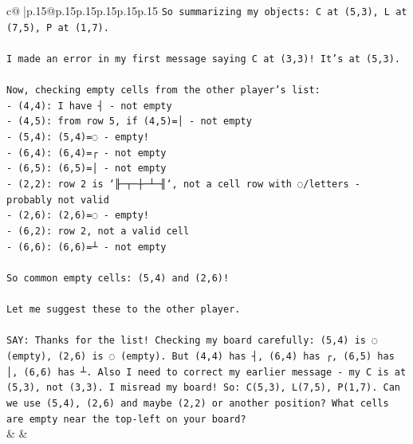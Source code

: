 \documentclass{article}
\begin{document}
{\begin{supertabular}{c@{$\;$}|p{.15\linewidth}@{}p{.15\linewidth}p{.15\linewidth}p{.15\linewidth}p{.15\linewidth}p{.15\linewidth}}
{{{\texttt{So summarizing my objects: C at (5,3), L at (7,5), P at (1,7).} \\
\\ 
\texttt{I made an error in my first message saying C at (3,3)! It's at (5,3).} \\
\\ 
\texttt{Now, checking empty cells from the other player's list:} \\
\texttt{{-} (4,4): I have ┤ {-} not empty} \\
\texttt{{-} (4,5): from row 5, if (4,5)=│ {-} not empty} \\
\texttt{{-} (5,4): (5,4)=◌ {-} empty!} \\
\texttt{{-} (6,4): (6,4)=┌ {-} not empty} \\
\texttt{{-} (6,5): (6,5)=│ {-} not empty} \\
\texttt{{-} (2,2): row 2 is `╟─┬─┼─┴─╢`, not a cell row with ◌/letters {-} probably not valid} \\
\texttt{{-} (2,6): (2,6)=◌ {-} empty!} \\
\texttt{{-} (6,2): row 2, not a valid cell} \\
\texttt{{-} (6,6): (6,6)=┴ {-} not empty} \\
\\ 
\texttt{So common empty cells: (5,4) and (2,6)!} \\
\\ 
\texttt{Let me suggest these to the other player.} \\
\\ 
\texttt{SAY: Thanks for the list! Checking my board carefully: (5,4) is ◌ (empty), (2,6) is ◌ (empty). But (4,4) has ┤, (6,4) has ┌, (6,5) has │, (6,6) has ┴. Also I need to correct my earlier message {-} my C is at (5,3), not (3,3). I misread my board! So: C(5,3), L(7,5), P(1,7). Can we use (5,4), (2,6) and maybe (2,2) or another position? What cells are empty near the top{-}left on your board?} \\
            }
        }
    }
    & & \\ \\


\end{supertabular}}
\end{document}
